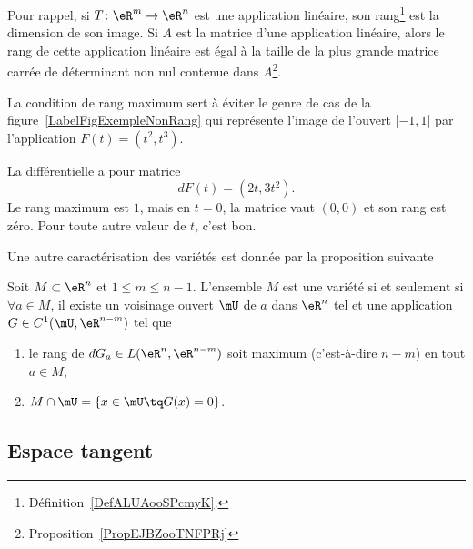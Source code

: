 Pour rappel, si \( T\colon \eR^m\to \eR^n\) est une application linéaire, son rang\footnote{Définition~\ref{DefALUAooSPcmyK}.} est la dimension de son image. Si \( A\) est la matrice d'une application linéaire, alors le rang de cette application linéaire est égal à la taille de la plus grande matrice carrée de déterminant non nul contenue dans \( A\)\footnote{Proposition~\ref{PropEJBZooTNFPRj}}.

La condition de rang maximum sert à éviter le genre de cas de la figure~\ref{LabelFigExempleNonRang} qui représente l'image de l'ouvert \( \mathopen\lbrack -1 , 1 \mathclose\rbrack\) par l'application \( F(t)=(t^2,t^3)\).


\newcommand{\CaptionFigExempleNonRang}{Quelque chose qui n'est pas de rang maximum et qui n'est pas une variété.}

%
La différentielle a pour matrice
\begin{equation}
	dF(t)=(2t,3t^2).
\end{equation}
Le rang maximum est \( 1\), mais en \( t=0\), la matrice vaut \( (0,0)\) et son rang est zéro. Pour toute autre valeur de \( t\), c'est bon.


Une autre caractérisation des variétés est donnée par la proposition suivante %
\begin{proposition}     \label{PropCarVarZerFonc}
	Soit \( M\subset \eR^n\) et \( 1\leq m\leq n-1\). L'ensemble \( M\) est une variété si et seulement si \( \forall a\in M\), il existe un voisinage ouvert \( \mU\) de \( a\) dans \( \eR^n\) tel et une application \( G\in C^1(\mU,\eR^{n-m})\) tel que
	\begin{enumerate}
		\item
		      le rang de \( dG_a\in L(\eR^n,\eR^{n-m})\) soit maximum (c'est-à-dire \( n-m\)) en tout \( a\in M\),
		\item
		      \( M\cap\mU=\{ x\in\mU\tq G(x)=0 \}\).
	\end{enumerate}
\end{proposition}


\subsection{Espace tangent}

